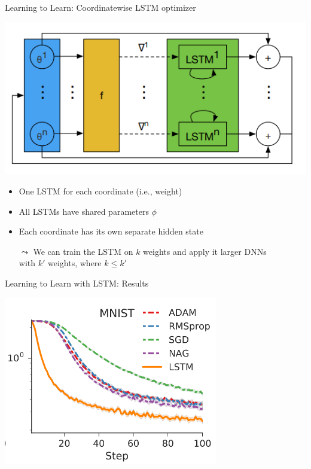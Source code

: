 \begin{frame}[c]{Learning to Learn: Coordinatewise LSTM optimizer }

\centering
\includegraphics[width=.7\textwidth]{images/l2l_shared_lstm.png}

\begin{itemize}
\item One LSTM for each coordinate (i.e., weight)
\item All LSTMs have shared parameters $\phi$
\item Each coordinate has its own separate hidden state
\pause
\item[$\leadsto$] We can train the LSTM on $k$ weights and apply it larger DNNs\\ with $k'$ weights, where $k \leq k'$
\end{itemize}

\end{frame}
\begin{frame}[c]{Learning to Learn with LSTM: Results }

\centering
\includegraphics[width=0.7\textwidth]{images/l2l_mnist_base}

\end{frame}
